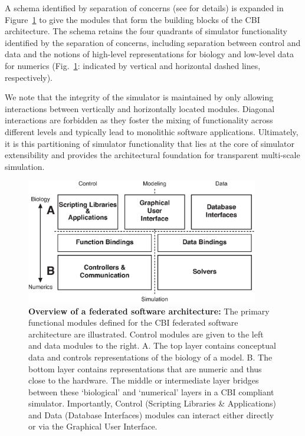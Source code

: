 \documentclass{article}
\begin{document}
A schema identified by separation of concerns (see
 \cite{10.1371/journal.pone.0028956} for details) is expanded in
Figure~\ref{fig:cbi-architecture-simple} to give the modules that
form the building blocks of the CBI architecture.  The schema retains
the four quadrants of simulator functionality identified by the
separation of concerns, including separation between control and data 
and the notions of high-level representations for biology and low-level data for
numerics (Fig.~\ref{fig:cbi-architecture-simple}: indicated by vertical and
horizontal dashed lines, respectively).

We note that the integrity of the simulator is maintained by only allowing interactions between vertically and horizontally located modules. Diagonal interactions are forbidden as they foster the mixing of functionality across different levels and typically lead to monolithic software applications. Ultimately, it is this partitioning of simulator functionality that lies at the core of simulator extensibility and provides the architectural foundation for transparent multi-scale simulation.

\begin{figure}[ht]
\begin{center}
\includegraphics[width=4in]{figures/cbi-architecture-simple.eps}
\end{center}
\caption{ {\bf Overview of a federated software architecture:}
  The primary functional modules defined for
  the CBI federated software architecture are illustrated.  Control modules are given
  to the left and data modules to the right.  A. The top layer
  contains conceptual data and controls representations of the biology
  of a model. B. The bottom layer contains representations that are
  numeric and thus close to the hardware.  The middle or intermediate
  layer bridges between these `biological' and `numerical' layers in a
  CBI compliant simulator. Importantly, Control (Scripting Libraries
  \& Applications) and Data (Database Interfaces) modules can interact
  either directly or via the Graphical User Interface. }
\label{fig:cbi-architecture-simple}
\end{figure}
\end{document}
